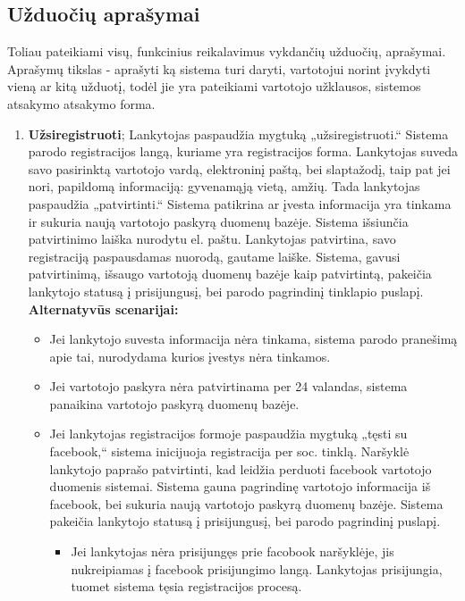 \documentclass{VUMIFPSkursinis}
\begin{document}
	\subsection{Užduočių aprašymai}
		Toliau pateikiami visų, funkcinius reikalavimus vykdančių užduočių, aprašymai. 
		Aprašymų tikslas - aprašyti ką sistema turi daryti, vartotojui norint įvykdyti vieną ar kitą užduotį,
		todėl jie yra pateikiami vartotojo užklausos, sistemos atsakymo atsakymo forma.
		\begin{enumerate}[label=\textbf{U\arabic*.}]
			\item \textbf{Užsiregistruoti};		
				Lankytojas paspaudžia mygtuką „užsiregistruoti.“ Sistema parodo registracijos langą, kuriame yra registracijos forma.
				Lankytojas suveda savo pasirinktą vartotojo vardą, elektroninį paštą, bei slaptažodį, taip pat jei nori, 
				papildomą informaciją: gyvenamąją vietą, amžių. Tada lankytojas paspaudžia „patvirtinti.“ 
				Sistema patikrina ar įvesta informacija yra tinkama ir sukuria naują vartotojo paskyrą duomenų bazėje.
				Sistema išsiunčia patvirtinimo laiška nurodytu el. paštu. 
				Lankytojas patvirtina, savo registraciją paspausdamas nuorodą, gautame laiške. Sistema, gavusi patvirtinimą, išsaugo vartotoją duomenų bazėje kaip patvirtintą,
				pakeičia lankytojo statusą į prisijungusį, bei parodo pagrindinį tinklapio puslapį.\\
				\textbf{Alternatyvūs scenarijai:}
				\begin{itemize}
					\item Jei lankytojo suvesta informacija nėra tinkama, sistema parodo pranešimą apie tai, nurodydama kurios įvestys nėra tinkamos.
					\item Jei vartotojo paskyra nėra patvirtinama per 24 valandas, sistema panaikina vartotojo paskyrą duomenų bazėje.
					\item Jei lankytojas registracijos formoje paspaudžia mygtuką „tęsti su facebook,“ sistema inicijuoja registracija per soc. tinklą.
	                    Naršyklė lankytojo paprašo patvirtinti, kad leidžia perduoti facebook vartotojo duomenis sistemai.
						Sistema gauna pagrindinę vartotojo informacija iš facebook, bei sukuria naują vartotojo paskyrą duomenų bazėje.
						Sistema pakeičia lankytojo statusą į prisijungusį, bei parodo pagrindinį puslapį.
						\begin{itemize}
							\item Jei lankytojas nėra prisijungęs prie facobook naršyklėje, jis nukreipiamas į facebook prisijungimo langą. 
								Lankytojas prisijungia, tuomet sistema tęsia registracijos procesą.

\end{itemize}
\end{itemize}
\end{enumerate}
\end{document}
